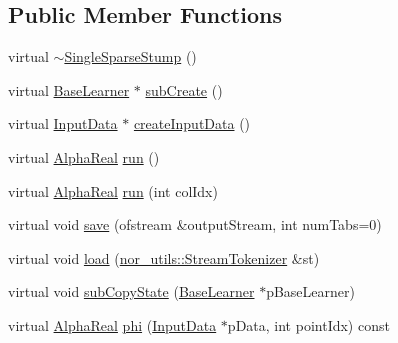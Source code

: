 \subsection*{Public Member Functions}
\begin{DoxyCompactItemize}
\item 
virtual \hyperlink{classMultiBoost_1_1SingleSparseStump_a2e094d05b5d68fa7c00d40d221de1f5d}{$\sim$SingleSparseStump} ()
\item 
virtual \hyperlink{classMultiBoost_1_1BaseLearner}{BaseLearner} $\ast$ \hyperlink{classMultiBoost_1_1SingleSparseStump_a7857e9ed102117f1c10f6642e06d1398}{subCreate} ()
\item 
virtual \hyperlink{classMultiBoost_1_1InputData}{InputData} $\ast$ \hyperlink{classMultiBoost_1_1SingleSparseStump_a7fc049426cf8eaf8dcb57b781633269d}{createInputData} ()
\item 
virtual \hyperlink{Defaults_8h_a80184c4fd10ab70a1a17c5f97dcd1563}{AlphaReal} \hyperlink{classMultiBoost_1_1SingleSparseStump_adf6766c237fb974323ca2c49c8b1bf09}{run} ()
\item 
virtual \hyperlink{Defaults_8h_a80184c4fd10ab70a1a17c5f97dcd1563}{AlphaReal} \hyperlink{classMultiBoost_1_1SingleSparseStump_a9f71f537668b45e18567ca2f3621b51b}{run} (int colIdx)
\item 
virtual void \hyperlink{classMultiBoost_1_1SingleSparseStump_a69365508ff9efa93d90450621048905e}{save} (ofstream \&outputStream, int numTabs=0)
\item 
virtual void \hyperlink{classMultiBoost_1_1SingleSparseStump_afbd9e4ab80b2483932e03ae675159f0d}{load} (\hyperlink{classnor__utils_1_1StreamTokenizer}{nor\_\-utils::StreamTokenizer} \&st)
\item 
virtual void \hyperlink{classMultiBoost_1_1SingleSparseStump_a0c815aa6bd664984f0baa6d94cde7cff}{subCopyState} (\hyperlink{classMultiBoost_1_1BaseLearner}{BaseLearner} $\ast$pBaseLearner)
\item 
virtual \hyperlink{Defaults_8h_a80184c4fd10ab70a1a17c5f97dcd1563}{AlphaReal} \hyperlink{classMultiBoost_1_1SingleSparseStump_aace5a5996e4c72d2806181fec628addc}{phi} (\hyperlink{classMultiBoost_1_1InputData}{InputData} $\ast$pData, int pointIdx) const 
\end{DoxyCompactItemize}
